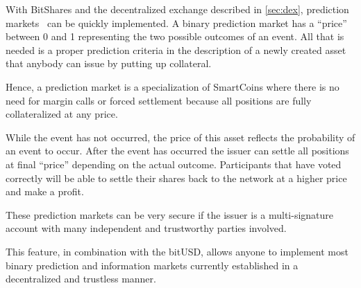 With BitShares and the decentralized exchange described in \cref{sec:dex},
prediction markets~\cite{wiki_pm} can be quickly implemented. A binary
prediction market has a ``price'' between 0 and 1 representing the two possible
outcomes of an event. All that is needed is a proper prediction criteria in the
description of a newly created asset that anybody can issue by putting up
collateral. 

Hence, a prediction market is a specialization of SmartCoins where there is no
need for margin calls or forced settlement because all positions are fully
collateralized at any price. 

While the event has not occurred, the price of this asset reflects the
probability of an event to occur. After the event has occurred the issuer can
settle all positions at final ``price'' depending on the actual outcome.
Participants that have voted correctly will be able to settle their shares back
to the network at a higher price and make a profit.

These prediction markets can be very secure if the issuer is a multi-signature
account with many independent and trustworthy parties involved.

This feature, in combination with the bitUSD, allows anyone to implement most
binary prediction and information markets currently established in a
decentralized and trustless manner.
